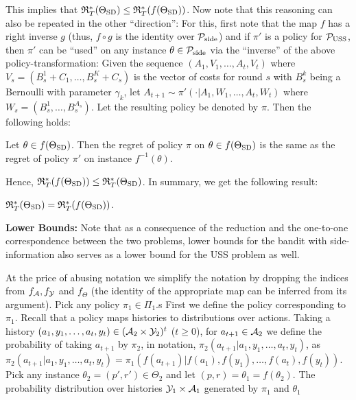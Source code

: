 This implies that $\mathfrak{R}_T^*(\Theta_{\mathrm{SD}})\le \mathfrak{R}_T^*(f(\Theta_{\mathrm{SD}}))$. Now note that this reasoning can also be repeated in the other ``direction'': 
For this, first note that the map $f$ has a right inverse $g$ 
(thus, $f\circ g$ is the identity over $\mathcal{P}_{\mathrm{side}}$)
and if $\pi'$ is a policy for $\mathcal{P}_{\mathrm{USS}}$, 
then $\pi'$ can be ``used''  on any instance $\theta\in \mathcal{P}_{\mathrm{side}}$
via the ``inverse'' of the above policy-transformation:
Given the sequence $(A_1,V_1,\dots,A_t,V_t)$ where 
$V_s= (B_s^1+C_1,\dots,B_ s^{K}+C_s)$ is the vector of costs for round $s$
with $B_s^k$ being a Bernoulli with parameter $\gamma_k$,
let $A_{t+1} \sim \pi'( \cdot| A_1,W_1,\dots,A_t,W_t)$ where
$W_s = (B_s^1,\dots,B_s^{A_s})$. Let the resulting policy be denoted by $\pi$.
Then the following holds:
\begin{prop}
Let $\theta \in f(\Theta_{\mathrm{SD}})$. Then the regret of policy $\pi$ on $\theta\in f(\Theta_{\mathrm{SD}})$ is the same
as the regret of policy $\pi'$ on instance $f^{-1}(\theta)$.
\end{prop}
Hence, $\mathfrak{R}_T^*(f(\Theta_{\mathrm{SD}}))\le \mathfrak{R}_T^*(\Theta_{\mathrm{SD}})$.
In summary, we get the following result:
\begin{cor}
$\mathfrak{R}_T^*(\Theta_{\mathrm{SD}}) = \mathfrak{R}_T^*(f(\Theta_{\mathrm{SD}}))$. 
\end{cor}
{\bf Lower Bounds:} Note that as a consequence of the reduction and the one-to-one correspondence between the two problems, lower bounds for the bandit with side-information also serves as a lower bound for the USS problem as well.



At the price of abusing notation 
we simplify the notation by dropping the indices from $f_{\mathcal{A}}, f_{\mathcal{Y}}$ and $f_{\Theta}$ (the identity of the appropriate map can be inferred from its argument).
Pick any policy $\pi_1\in \Pi_1$.s
First we define the policy corresponding to $\pi_1$.
Recall that a policy maps histories to distributions over actions.
Taking a history $(a_1,y_1,\dots,a_t,y_t)\in (\mathcal{A}_2\times \mathcal{Y}_2)^t$ ($t\ge 0$),
for $a_{t+1}\in \mathcal{A}_2$ we define the probability of taking $a_{t+1}$ by $\pi_2$, in notation,
 $\pi_2(a_{t+1}|a_1,y_1,\dots,a_t,y_t)$, as
 $\pi_2(a_{t+1}|a_1,y_1,\dots,a_t,y_t) = \pi_1(f(a_{t+1})|f(a_1),f(y_1),\dots,f(a_t),f(y_t))$.
Pick any instance $\theta_2 = (p',r')\in \Theta_2$ and let $(p,r) = \theta_1  = f( \theta_2)$.
The probability distribution over histories $\mathcal{Y}_1 \times \mathcal{A}_1$ generated by $\pi_1$ and $\theta_1$
\fi



